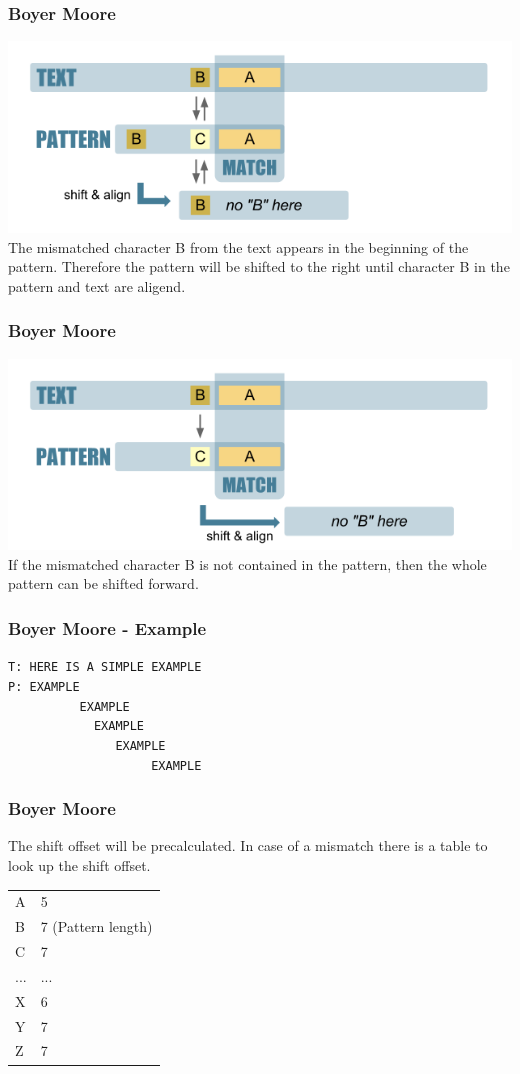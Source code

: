 \begin{frame}[fragile]
  \frametitle{Boyer Moore}
  \includegraphics[scale=0.4]{img/bm1.png}\\
  \vspace{1mm}
  The mismatched character B from the text appears in the beginning of the pattern.
  Therefore the pattern will be shifted to the right until character B in the
  pattern and text are aligend.
\end{frame}

\begin{frame}[fragile]
  \frametitle{Boyer Moore}
  \includegraphics[scale=0.4]{img/bm2.png}\\
  \vspace{1mm}
  If the mismatched character B is not contained in the pattern, then the whole
  pattern can be shifted forward.
\end{frame}

\begin{frame}[fragile] 
\frametitle{Boyer Moore - Example}
\verb|T: HERE IS A SIMPLE EXAMPLE|\\
\verb|P: EXAMPLE|\\
\verb|          EXAMPLE|\\
\verb|            EXAMPLE|\\
\verb|               EXAMPLE|\\
\verb|                    EXAMPLE|
\end{frame}

\begin{frame}[fragile] 
\frametitle{Boyer Moore}
The shift offset will be precalculated. In case of a mismatch there is a table to
look up the shift offset.\\

\begin{tabular}{l|l}
A & 5\\
B & 7 (Pattern length)\\
C & 7\\
...& ...\\
X & 6\\
Y & 7\\
Z & 7
\end{tabular}
\end{frame}

